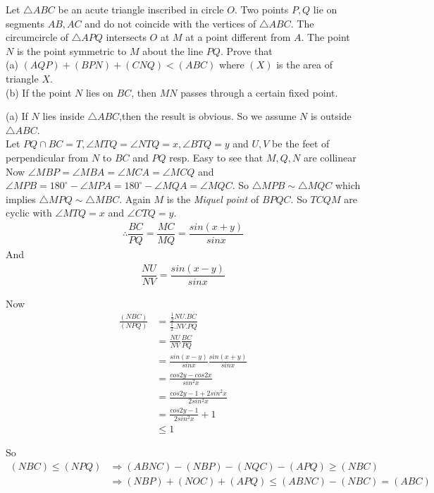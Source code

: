 \documentclass{subfile}
\begin{document}
	\begin{problem}
		Let $\triangle ABC$ be an acute triangle inscribed in circle $O$. Two points $P,Q$ lie on segments $AB,AC$ and
		do not coincide with the vertices of $\triangle ABC$. The circumcircle of $\triangle APQ$ intersects $O$ at $M$ at a point
		different from $A$. The point $N$ is the point symmetric to $M$ about the line $PQ$. Prove that\\
		(a) $(AQP) + (BPN) + (CNQ) < (ABC)$ where $(X)$ is the area of triangle $X$.\\[12pt]
		(b) If the point $N$ lies on $BC$, then $MN$ passes through a certain fixed point.
	\end{problem}
	\begin{solution}
		(a) If $N$ lies inside $\triangle ABC$,then the result is obvious. So we assume $N$ is outside $\triangle ABC$.\\
		Let $PQ\cap BC=T,\angle MTQ=\angle NTQ=x,\angle BTQ=y$ and $U,V$ be the feet of perpendicular from $N$ to $BC$ and $PQ$ resp.
		Easy to see that $M,Q,N$ are collinear
		Now $\angle MBP=\angle MBA=\angle MCA=\angle MCQ$ and $\angle MPB=180^{\circ}-\angle MPA=180^{\circ}-\angle MQA=\angle MQC$.
		So $\triangle MPB \sim \triangle MQC$ which implies $\triangle MPQ \sim \triangle MBC$.
		Again $M$ is the \textit{Miquel point} of $BPQC$. So $TCQM$ are cyclic with $\angle MTQ=x$ and $\angle CTQ=y$.\\ 
		
		\begin{align*}
		    \therefore \dfrac{BC}{PQ}=\dfrac{MC}{MQ}=\dfrac{sin (x+y)}{sin x}
		\end{align*}
		And 
		\begin{align*}
		  \dfrac{NU}{NV}=\dfrac{sin (x-y)}{sin x}
		 \end{align*}
		
		Now 
		\begin{align*}
		\frac{(NBC)}{(NPQ)} & =\frac{\frac{1}{2}NU.BC}{\frac{1}{2}.NV.PQ}\\
		& =\frac{NU}{NV}\frac{BC}{PQ}\\
		& =\frac{sin (x-y)}{sin x}\frac{sin (x+y)}{sin x}\\
		& =\frac{cos 2y-cos 2x}{sin^2x}\\
		& =\frac{cos 2y-1+2sin^2 x}{2sin^2 x}\\
		& =\frac{cos 2y-1}{2sin^2 x}+1\\              
		& \leq 1
		\end{align*}

		So
		\begin{equation*}
		\begin{aligned} 
		(NBC)\leq (NPQ) & \Rightarrow (ABNC)-(NBP)-(NQC)-(APQ) \geq (NBC)\\
		& \Rightarrow (NBP)+(NOC)+(APQ) \leq (ABNC)-(NBC)=(ABC)\\   
		\end{aligned}
		\end{equation*} 
		

\end{solution}
\end{document}
